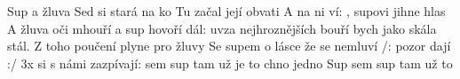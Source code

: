 \begin{TEXT}{Sup a žluva}
\SLOKA Sed si stará  na ko  \NL
Tu začal její  obvati  \NL
A  na ni ví:  
\SLOKA {}, supovi jihne hlas \NL
{} \NL
A žluva oči mhouří a sup hovoří dál: \NL
uv{za nejhroznějších bouří bych jako skála stál.} 
\SLOKA {}\NL
Z toho poučení plyne pro žluvy \NL
Se supem o lásce že se nemluví 
\SLOKA /:  pozor dají :/ 3x \NL
{} si s námi zazpívají: \NL
{} sem sup tam  už je to chno jedno \NL
Sup sem sup tam  už  to  \NL
\end{TEXT}
